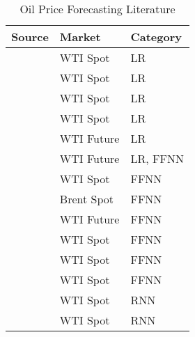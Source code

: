 \begin{table}[H]
	\begin{center}
			\begin{tabular}{l | l | l}
		 		Source & Market &  Category \\
				\hline
				\cite{ye_forecasting_2002} & WTI Spot  & LR \\
				\cite{ye_monthly_2005} & WTI Spot  & LR  \\
				\cite{ye_forecasting_2006} & WTI Spot  & LR\\
				\cite{dees_assessing_2008} & WTI Spot  & LR\\
				\cite{bu_price_2011} & WTI Future  & LR\\
				\cite{moshiri_forecasting_2006} & WTI Future  & LR, FFNN\\
				\cite{haidar_forecasting_2008} & WTI Spot  & FFNN\\
				\cite{alizadeh_monthly_2010} & Brent Spot  & FFNN \\
				\cite{shambora_are_2007} & WTI Future  & FFNN\\
				\cite{amin-naseri_hybrid_2007} & WTI Spot  & FFNN\\
				\cite{pang_forecasting_2011} & WTI Spot  & FFNN\\
				\cite{he_crude_2012} & WTI Spot  & FFNN\\
				\cite{wang_forecasting_2016} &  WTI Spot  & RNN\\
				\cite{mingming_multiple_2012} &  WTI Spot  & RNN
			\end{tabular}
	\end{center}
	\caption{Oil Price Forecasting Literature}
	\label{tab:oil_lit}
\end{table}
